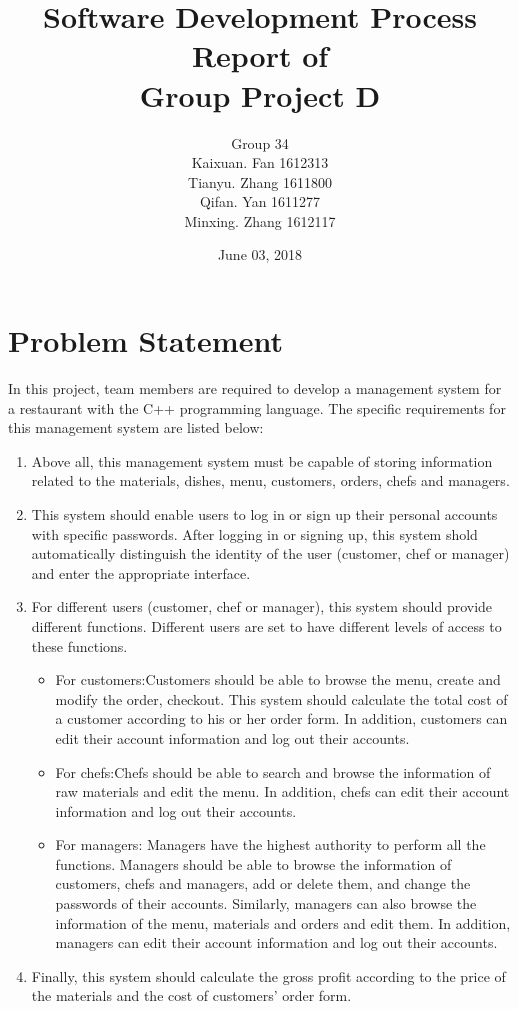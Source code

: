 \documentclass{article}
\title{Software Development Process Report of \\ Group Project D}
\author{Group 34\\Kaixuan. Fan 1612313\\Tianyu. Zhang 1611800\\Qifan. Yan 1611277\\Minxing. Zhang 1612117}
\date{June 03, 2018}
\begin{document}
\maketitle

\newpage
\tableofcontents

\newpage
\pagestyle{fancy}
\chead{}

\section{Problem Statement}
In this project, team members are required to develop a management system for a restaurant with the C++ programming language. The specific requirements for this management system are listed below:
\begin{enumerate}
    \item Above all, this management system must be capable of storing information related to the materials, dishes, menu, customers, orders, chefs and managers.
    \item This system should enable users to log in or sign up their personal accounts with specific passwords. After logging in or signing up, this system shold automatically distinguish the identity of the user (customer, chef or manager) and enter the appropriate interface.
    \item For different users (customer, chef or manager), this system should provide different functions. Different users are set to have different levels of access to these functions.
    \begin{itemize}
        \item For customers:\newline Customers should be able to browse the menu, create and modify the order, checkout. This system should calculate the total cost of a customer according to his or her order form. In addition, customers can edit their account information and log out their accounts.
        \item For chefs:\newline Chefs should be able to search and browse the information of raw materials and edit the menu. In addition, chefs can edit their account information and log out their accounts.
        \item For managers: \newline Managers have the highest authority to perform all the functions. Managers should be able to browse the information of customers, chefs and managers, add or delete them, and change the passwords of their accounts. Similarly, managers can also browse the information of the menu, materials and orders and edit them. In addition, managers can edit their account information and log out their accounts.
    \end{itemize}
    \item Finally, this system should calculate the gross profit according to the price of the materials and the cost of customers' order form.
\end{enumerate}
\end{document}
